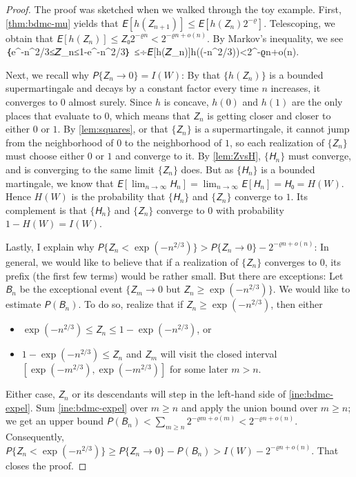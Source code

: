 \documentclass[openany]{amsbook}
\numberwithin{equation}{chapter}
\numberwithin{figure}{chapter}
\numberwithin{table}{chapter}
\def\[#1\]{\begin{equation*}{#1}\end{equation*}}
\theoremstyle{definition}	理dfn:Definition~?s			理exa:Example~?s
\theoremstyle{remark}		理cla:Claim~?s				理rem:Remark~?s
\begin{document}
	\begin{proof}
		The proof was sketched when we walked through the toy example.
		First, \cref{thm:bdmc-mu} yields that $𝘌[h(𝘡_{n+1})]≤𝘌[h(𝘡_n)2^{-ϱ}]$.
		Telescoping, we obtain that $𝘌[h(𝘡_n)]≤𝘡₀2^{-ϱn}<2^{-ϱn+o(n)}$.
		By Markov's inequality, we see
		\[𝘗｛e^{-n^{2/3}}≤𝘡_n≤1-e^{-n^{2/3}}｝
			≤÷{𝘌[h(𝘡_n)]}{h(\exp(-n^{2/3}))}<2^{-ϱn+o(n)}.\label{ine:bdmc-expel}\]
		
		Next, we recall why $𝘗\{𝘡_n→0\}=I(W)$:
		By that $\{h(𝘡_n)\}$ is a bounded supermartingale and decays by a constant
		factor every time $n$ increases, it converges to $0$ almost surely.
		Since $h$ is concave, $h(0)$ and $h(1)$ are
		the only places that evaluate to $0$, which means that
		$𝘡_n$ is getting closer and closer to either $0$ or $1$.
		By \cref{lem:squares}, or that $\{𝘡_n\}$ is a supermartingale,
		it cannot jump from the neighborhood of $0$ to the neighborhood of $1$,
		so each realization of $\{𝘡_n\}$ must choose
		either $0$ or $1$ and converge to it.
		By \cref{lem:ZvsH}, $\{𝘏_n\}$ must converge,
		and is converging to the same limit $\{𝘡_n\}$ does.
		But as $\{𝘏_n\}$ is a bounded martingale,
		we know that $𝘌[\lim_{n→∞}𝘏_n]=\lim_{n→∞}𝘌[𝘏_n]=𝘏₀=H(W)$.
		Hence $H(W)$ is the probability that $\{𝘏_n\}$ and $\{𝘡_n\}$ converge to $1$.
		Its complement is that $\{𝘏_n\}$ and $\{𝘡_n\}$
		converge to $0$ with probability $1-H(W)=I(W)$.
		
		Lastly, I explain why $𝘗\{𝘡_n<\exp(-n^{2/3})\}>𝘗\{𝘡_n→0\}-2^{-ϱn+o(n)}$:
		In general, we would like to believe that if a realization of $\{𝘡_n\}$
		converges to $0$, its prefix (the first few terms) would be rather small.
		But there are exceptions:
		Let $𝘉_n$ be the exceptional event $\{𝘡_m→0$ but $𝘡_n≥\exp(-n^{2/3})\}$.
		We would like to estimate $𝘗(𝘉_n)$.
		To do so, realize that if $𝘡_n≥\exp(-n^{2/3})$, then either
		\begin{itemize}
			\item	$\exp(-n^{2/3})≤𝘡_n≤1-\exp(-n^{2/3})$, or
			\item	$1-\exp(-n^{2/3})≤𝘡_n$ and $𝘡_m$ will visit the closed interval	\\
					$[\exp(-m^{2/3}),\exp(-m^{2/3})]$ for some later $m>n$.
		\end{itemize}
		Either case, $𝘡_n$ or its descendants will step in
		the left-hand side of \cref{ine:bdmc-expel}.
		Sum \cref{ine:bdmc-expel} over $m≥n$ and apply the union bound over $m≥n$;
		we get an upper bound $𝘗(𝘉_n)<∑_{m≥n}2^{-ϱm+o(m)}<2^{-ϱn+o(n)}$.
		Consequently, $𝘗\{𝘡_n<\exp(-n^{2/3})\}≥𝘗\{𝘡_n→0\}-𝘗(𝘉_n)>I(W)-2^{-ϱn+o(n)}$.
		That closes the proof.
	\end{proof}
	
\end{document}
